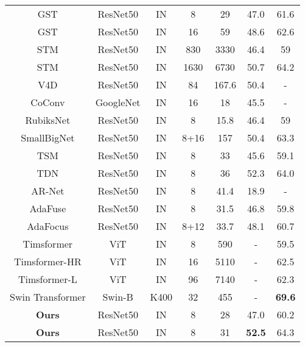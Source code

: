 \documentclass[journal]{IEEEtran}
\begin{document}
\begin{table*}[ht]
\begin{tabular}{c|c|c|c|c|c|c}
GST \cite{luo2019grouped} & ResNet50 & IN & 8 & 29 & 47.0 & 61.6 \\
		GST \cite{luo2019grouped} & ResNet50 & IN & 16 & 59 & 48.6 & 62.6 \\
		STM \cite{jiang2019stm} & ResNet50 & IN & 830 & 3330 & 46.4 & 59 \\
		STM \cite{jiang2019stm} & ResNet50 & IN & 1630 & 6730 & 50.7 & 64.2 \\
		V4D \cite{zhang2019v4d} & ResNet50 & IN & 84 & 167.6 & 50.4 & - \\
		CoConv \cite{chen2021video} & GoogleNet & IN & 16 & 18 & 45.5 & - \\
		RubiksNet \cite{fan2020rubiksnet} & ResNet50 & IN & 8 & 15.8 & 46.4 & 59 \\
		SmallBigNet \cite{li2020smallbignet} & ResNet50 & IN & 8+16 & 157 & 50.4 & 63.3 \\
		TSM \cite{lin2019tsm} & ResNet50 & IN & 8 & 33 & 45.6 & 59.1 \\
		TDN \cite{wang2021tdn} & ResNet50 & IN & 8 & 36 & 52.3 & 64.0 \\	\hline
		AR-Net \cite{meng2020ar}  & ResNet50 & IN & 8 & 41.4 & 18.9 & - \\	
		AdaFuse \cite{meng2020adafuse} & ResNet50 & IN & 8 & 31.5 & 46.8 & 59.8 \\	
		AdaFocus \cite{Wang_2021_AdaFocus} & ResNet50 & IN & 8+12 & 33.7 & 48.1 & 60.7 \\	\hline
		Timsformer \cite{bertasius2021space} & ViT & IN & 8 & 590 & - & 59.5 \\
		Timsformer-HR \cite{bertasius2021space} & ViT & IN & 16 & 5110 & - & 62.5 \\
		Timsformer-L \cite{bertasius2021space} & ViT & IN & 96 & 7140 & - & 62.3 \\
		Swin Transformer \cite{liu2021video} & Swin-B & K400 & 32 & 455 & - & \textbf{69.6} \\
		\hline
		\textbf{Ours} & ResNet50 & IN & 8 & 28 & 47.0  & 60.2\\
		\textbf{Ours} & ResNet50 & IN & 8 & 31 & \textbf{52.5} & 64.3 \\
		\hline
	\end{tabular}
\end{table*}
\end{document}

